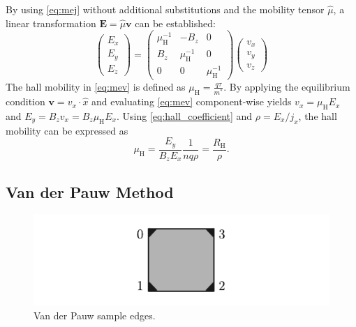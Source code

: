 By using \cref{eq:mej} without additional substitutions and the mobility tensor 
$\hat{\mu}$, a linear transformation $\mathbf{E}=\hat{\mu} \mathbf{v}$ 
can be established:
\begin{equation}
	\begin{pmatrix}
		E_{x} \\
		E_{y} \\
		E_{z}
	\end{pmatrix}
	=\begin{pmatrix}
		\mu_\mathrm{H}^{-1} & -B_{z}              & 0                   \\
		B_{z}               & \mu_\mathrm{H}^{-1} & 0                   \\
		0                   & 0                   & \mu_\mathrm{H}^{-1}
	\end{pmatrix}
	\begin{pmatrix}
		v_{x} \\
		v_{y} \\
		v_{z}
	\end{pmatrix}
	\label{eq:mev}
\end{equation}
The hall mobility in \cref{eq:mev} is defined as $\mu_{\mathrm{H}}=\frac{q\tau}{m^{*}}$.
By applying the equilibrium condition $\mathbf{v}=v_x \cdot \hat{x}$ and evaluating 
\cref{eq:mev} component-wise yields $v_{x} = \mu_{\mathrm{H}}E_{x}$ and 
$E_{y}=B_{z}v_{x}=B_{z}\mu_{\mathrm{H}}E_{x}$.
Using \cref{eq:hall_coefficient} and $\rho=E_x / j_x$, the hall mobility can be expressed as
\begin{equation}
	\mu_{\mathrm{H}}=\frac{E_y}{B_z E_x} \frac{1}{nq\rho}=\frac{R_{\mathrm{H}}}{\rho}.
	\label{eq:hall_mobility}
\end{equation}

\subsection{Van der Pauw Method}

\begin{figure}
	\centering
	\includegraphics{../assets/van_der_pauw.pdf}
	\caption{Van der Pauw sample edges.
		}
	\label{fig:van_der_pauw}
\end{figure}

